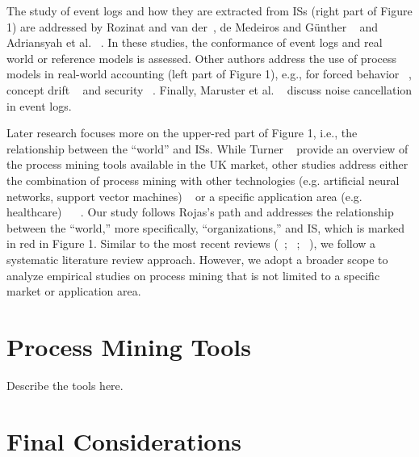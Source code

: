 The study of event logs and how they are extracted from ISs (right part of Figure 1) are addressed by Rozinat and van der~\cite{rozinat2006decision}, de Medeiros and Günther ~\cite{de2005process} and Adriansyah et al. ~\cite{adriansyah2011conformance}. In these studies, the conformance of event logs and real world or reference models is assessed. Other authors address the use of process models in real-world accounting (left part of Figure 1), e.g., for forced behavior ~\cite{wen2009novel}, concept drift ~\cite{engel2014case} and security ~\cite{van2005process}. Finally, Maruster et al. ~\cite{muarucster2006rule} discuss noise cancellation in event logs.

Later research focuses more on the upper-red part of Figure 1, i.e., the relationship between the “world” and ISs. While Turner ~\cite{turner2012process} provide an overview of the process mining tools available in the UK market, other studies address either the combination of process mining with other technologies (e.g. artificial neural networks, support vector machines) ~\cite{maita2015ultraflexible} or a specific application area (e.g. healthcare) ~\cite{rojas2016process} ~\cite{yang2014process}. Our study follows Rojas’s path and addresses the relationship between the “world,” more specifically, “organizations,” and IS, which is marked in red in Figure 1. Similar to the most recent reviews (~\cite{kurniati2016process}; ~\cite{maita2015process}; ~\cite{rojas2016process}), we follow a systematic literature review approach. However, we adopt a broader scope to analyze empirical studies on process mining that is not limited to a specific market or application area.

\section{Process Mining Tools}

Describe the tools here.

\section{Final Considerations}
